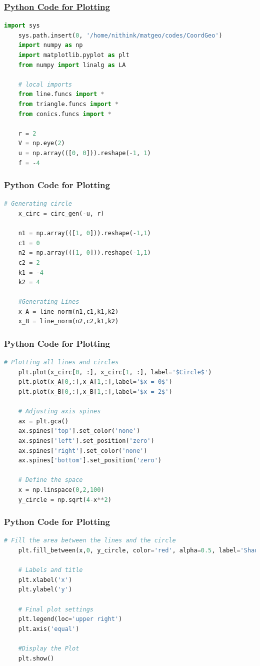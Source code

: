\documentclass{beamer}
\theoremstyle{remark}
\numberwithin{equation}{section}
\begin{document}
\begin{frame}[fragile]
	\frametitle{\underline{Python Code for Plotting}}
	\begin{lstlisting}[language=Python]
	import sys
	sys.path.insert(0, '/home/nithink/matgeo/codes/CoordGeo')
	import numpy as np
	import matplotlib.pyplot as plt
	from numpy import linalg as LA
	
	# local imports
	from line.funcs import *
	from triangle.funcs import *
	from conics.funcs import *

	r = 2
	V = np.eye(2)
	u = np.array(([0, 0])).reshape(-1, 1)
	f = -4
	\end{lstlisting}
\end{frame}
\begin{frame}[fragile]
	\frametitle{Python Code for Plotting}
	\begin{lstlisting}[language=Python]
	# Generating circle
	x_circ = circ_gen(-u, r)
	
	n1 = np.array(([1, 0])).reshape(-1,1) 
	c1 = 0
	n2 = np.array(([1, 0])).reshape(-1,1)
	c2 = 2
	k1 = -4
	k2 = 4
	
	#Generating Lines
	x_A = line_norm(n1,c1,k1,k2)
	x_B = line_norm(n2,c2,k1,k2)
	\end{lstlisting}
\end{frame}
\begin{frame}[fragile]
	\frametitle{Python Code for Plotting}
	\begin{lstlisting}[language=Python]
	# Plotting all lines and circles
	plt.plot(x_circ[0, :], x_circ[1, :], label='$Circle$')
	plt.plot(x_A[0,:],x_A[1,:],label='$x = 0$')
	plt.plot(x_B[0,:],x_B[1,:],label='$x = 2$')

	# Adjusting axis spines
	ax = plt.gca()
	ax.spines['top'].set_color('none')
	ax.spines['left'].set_position('zero')
	ax.spines['right'].set_color('none')
	ax.spines['bottom'].set_position('zero')

	# Define the space
	x = np.linspace(0,2,100)
	y_circle = np.sqrt(4-x**2)
	\end{lstlisting}
\end{frame}
\begin{frame}[fragile]
	\frametitle{Python Code for Plotting}
        \begin{lstlisting}[language=Python]
	# Fill the area between the lines and the circle
	plt.fill_between(x,0, y_circle, color='red', alpha=0.5, label='Shaded Region')

	# Labels and title
	plt.xlabel('x')
	plt.ylabel('y')
	
	# Final plot settings
	plt.legend(loc='upper right')
	plt.axis('equal')
	
	#Display the Plot
	plt.show()
	\end{lstlisting}
\end{frame}
\end{document}
